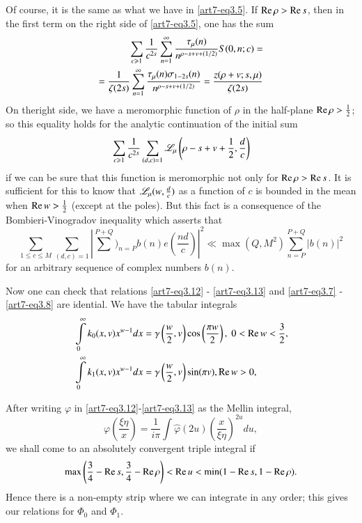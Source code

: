 Of course, it is the same as what we have in \eqref{art7-eq3.5}. If $\operatorname{Re} \rho > \operatorname{Re} s$, then in the first term on the right side of \eqref{art7-eq3.5}, one has the sum 
\begin{align}
\sum\limits_{c \geqslant 1} \frac{1}{c^{2s}} \sum\limits^\infty_{n=1} \frac{\tau_\mu(n)}{n^{\rho-s+v+(1/2)}} S(0, n ; c) = \label{art7-eq3.14}\\
= \frac{1}{\zeta(2s)} \sum\limits^\infty_{n=1} \frac{\tau_\mu (n) \sigma_{1-2s } (n)}{n^{\rho -s + v + (1/2)}} = \frac{z(\rho + v; s, \mu)}{ \zeta(2s)} \notag
\end{align}
On the\pageoriginale right side, we have a meromorphic function of $\rho$ in the half-plane $\operatorname{Re} \rho > \frac{1}{2}$; so this equality holds for the analytic continuation of the initial sum 
\begin{equation}
\sum\limits_{c \geqslant 1} \frac{1}{c^{2s}} \sum\limits_{(d,c) =1} \mathscr{L}_\mu \left(\rho - s+ v + \frac{1}{2}, \frac{d}{c} \right) \label{art7-eq3.15}
\end{equation}
if we can be sure that this function is meromorphic not only for $\operatorname{Re} \rho > \operatorname{Re} s$. It is sufficient for this to know that $\mathscr{L}_\mu(w,\frac{d}{c})$ as a function of $c$ is bounded in the mean when $\operatorname{Re} w > \frac{1}{2}$ (except at the poles). But this fact is a consequence of the Bombieri-Vinogradov inequality which asserts that
\begin{equation}
\sum\limits_{1 \leqslant  c \leqslant M} \sum\limits_{(d, c) =1}
\left|\sum\limits^{P+Q})_{n=P} b(n) e (\frac{nd}{c}) \right|^2 \ll \max (Q, M^2) \sum\limits^{P+Q}_{n=P} |b(n)|^2 \label{art7-eq3.16}
\end{equation}
for an arbitrary sequence of complex numbers $b(n)$.

Now one can check that relations \eqref{art7-eq3.12} - \eqref{art7-eq3.13} and \eqref{art7-eq3.7} - \eqref{art7-eq3.8} are idential. We have the tabular integrals 
\begin{align}
& \int\limits^\infty_0 k_0(x, v) x^{w-1} dx = \gamma \left(\frac{w}{2}, v \right)  \cos \left(\frac{\pi w}{2} \right), \; 0 < \operatorname{Re} w < \frac{3}{2}, \label{art7-eq3.17}\\ 
& \int\limits^\infty_0 k_1 (x,v) x^{w-1} dx = \gamma \left(\frac{w}{2}, v \right) \sin (\pi v), \operatorname{Re} w > 0, \label{art7-eq3.18}
\end{align}

After writing $\varphi$ in \eqref{art7-eq3.12}-\eqref{art7-eq3.13} as the Mellin integral, 
$$
\varphi \left(\frac{\xi \eta}{x} \right) = \frac{1}{i\pi} \int \hat{\varphi} (2 u) \left(\frac{x}{\xi \eta} \right)^{2u} du, 
$$
we shall come to an absolutely convergent triple integral if 
\begin{equation*}
\max \left(\frac{3}{4} - \operatorname{Re} s, \frac{3}{4} - \operatorname{Re} \rho \right) <\operatorname{Re} u < \min (1-\operatorname{Re} s, 1 -\operatorname{Re} \rho). 
\end{equation*}
Hence there is a non-empty strip where we can integrate in any order; this gives our relations for $\Phi_0$ and $\Phi_1$.

